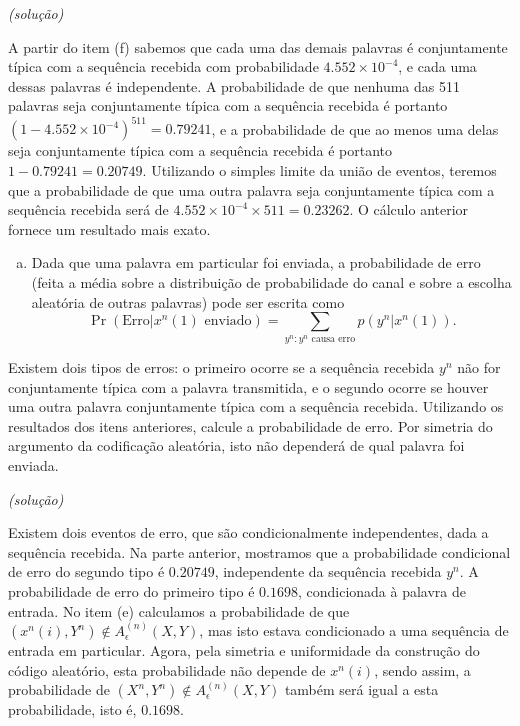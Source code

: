 \begin{frame}[allowframebreaks]
\begin{exercise}
  \examplebreak
  \textit{(solução)}

  A partir do item (f) sabemos que cada uma das demais palavras é conjuntamente 
  típica com a sequência recebida com probabilidade $4.552 \times 10^{-4}$, e 
  cada uma dessas palavras é independente. A probabilidade de que nenhuma das 
  511 palavras seja conjuntamente típica com a sequência recebida é portanto
  $(1 - 4.552 \times 10^{-4})^{511} = 0.79241$, e a probabilidade de que ao menos
  uma delas seja conjuntamente típica com a sequência recebida é portanto
  $1-0.79241 = 0.20749$. Utilizando o simples limite da união de eventos,
  teremos que a probabilidade de que uma outra palavra seja conjuntamente típica
  com a sequência recebida será de $4.552 \times 10^{-4} \times 511 = 0.23262$.
  O cálculo anterior fornece um resultado mais exato.

  \examplebreak
  \begin{enumerate}[h)]
  \item Dada que uma palavra em particular foi enviada, a probabilidade de erro
  (feita a média sobre a distribuição de probabilidade do canal e sobre a escolha
  aleatória de outras palavras) pode ser escrita como
  \begin{equation}
  \Pr(\text{Erro} | x^n(1) \text{ enviado}) = \sum_{y^n : y^n \text{ causa erro}} 
  p(y^n | x^n(1)) .
  \end{equation}
  \end{enumerate}

  \examplebreak

  Existem dois tipos de erros: o primeiro ocorre se a sequência recebida $y^n$
  não for conjuntamente típica com a palavra transmitida, e o segundo ocorre se 
  houver uma outra palavra conjuntamente típica com a sequência recebida.
  Utilizando os resultados dos itens anteriores, calcule a probabilidade de erro.
  Por simetria do argumento da codificação aleatória, isto não dependerá
  de qual palavra foi enviada.

  \examplebreak
  \textit{(solução)}

  Existem dois eventos de erro, que são condicionalmente independentes, dada
  a sequência recebida. Na parte anterior, mostramos que a probabilidade condicional
  de erro do segundo tipo é $0.20749$, independente da sequência recebida $y^n$.
  A probabilidade de erro do primeiro tipo é $0.1698$, condicionada à palavra
  de entrada. No item (e) calculamos a probabilidade de que 
  $(x^n(i), Y^n) \notin A_{\epsilon}^{(n)}(X,Y)$, mas isto estava condicionado
  a uma sequência de entrada em particular. Agora, pela simetria e uniformidade
  da construção do código aleatório, esta probabilidade não depende de $x^n(i)$,
  sendo assim, a probabilidade de $(X^n, Y^n) \notin A_{\epsilon}^{(n)}(X,Y)$
  também será igual a esta probabilidade, isto é, $0.1698$.


\end{exercise}
\end{frame}
